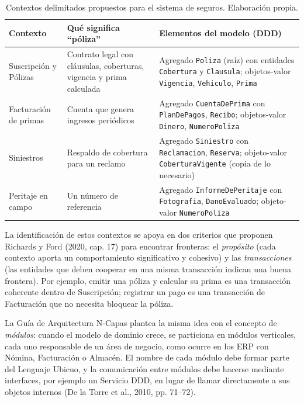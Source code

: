 \documentclass[11pt,a4paper]{article}
\begin{document}
\begin{table}[htbp]
\centering
\small
\renewcommand{\arraystretch}{1.3}
\begin{tabularx}{\textwidth}{>{\raggedright\arraybackslash}p{2.6cm} >{\raggedright\arraybackslash}X >{\raggedright\arraybackslash}X}
\toprule
\textbf{Contexto} & \textbf{Qué significa ``póliza''} & \textbf{Elementos del modelo (DDD)} \\
\midrule
Suscripción y Pólizas & Contrato legal con cláusulas, coberturas, vigencia y prima calculada & Agregado \texttt{Poliza} (raíz) con entidades \texttt{Cobertura} y \texttt{Clausula}; objetos-valor \texttt{Vigencia}, \texttt{Vehiculo}, \texttt{Prima} \\
Facturación de primas & Cuenta que genera ingresos periódicos & Agregado \texttt{CuentaDePrima} con \texttt{PlanDePagos}, \texttt{Recibo}; objetos-valor \texttt{Dinero}, \texttt{NumeroPoliza} \\
Siniestros & Respaldo de cobertura para un reclamo & Agregado \texttt{Siniestro} con \texttt{Reclamacion}, \texttt{Reserva}; objeto-valor \texttt{CoberturaVigente} (copia de lo necesario) \\
Peritaje en campo & Un número de referencia & Agregado \texttt{InformeDePeritaje} con \texttt{Fotografia}, \texttt{DanoEvaluado}; objeto-valor \texttt{NumeroPoliza} \\
\bottomrule
\end{tabularx}
\caption{Contextos delimitados propuestos para el sistema de seguros. Elaboración propia.}
\label{tab:contextos}
\end{table}

La identificación de estos contextos se apoya en dos criterios que proponen Richards y Ford (2020, cap. 17) para encontrar fronteras: el \emph{propósito} (cada contexto aporta un comportamiento significativo y cohesivo) y las \emph{transacciones} (las entidades que deben cooperar en una misma transacción indican una buena frontera). Por ejemplo, emitir una póliza y calcular su prima es una transacción coherente dentro de Suscripción; registrar un pago es una transacción de Facturación que no necesita bloquear la póliza.

La Guía de Arquitectura N-Capas plantea la misma idea con el concepto de \emph{módulos}: cuando el modelo de dominio crece, se particiona en módulos verticales, cada uno responsable de un área de negocio, como ocurre en los ERP con Nómina, Facturación o Almacén. El nombre de cada módulo debe formar parte del Lenguaje Ubicuo, y la comunicación entre módulos debe hacerse mediante interfaces, por ejemplo un Servicio DDD, en lugar de llamar directamente a sus objetos internos (De la Torre et al., 2010, pp. 71--72).
\end{document}
